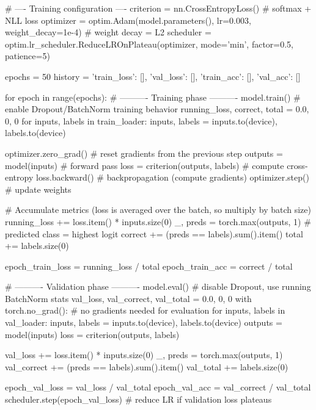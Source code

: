 \begin{codebox}[title={Training configuration}]
# ---- Training configuration ----
criterion = nn.CrossEntropyLoss()                                            # softmax + NLL loss
optimizer = optim.Adam(model.parameters(), lr=0.003, weight_decay=1e-4)      # weight decay = L2
scheduler = optim.lr_scheduler.ReduceLROnPlateau(optimizer, mode='min', factor=0.5, patience=5)

epochs = 50
history = {'train_loss': [], 'val_loss': [], 'train_acc': [], 'val_acc': []}

for epoch in range(epochs):
    # ---------- Training phase ----------
    model.train()                          # enable Dropout/BatchNorm training behavior
    running_loss, correct, total = 0.0, 0, 0
    for inputs, labels in train_loader:
        inputs, labels = inputs.to(device), labels.to(device)

        optimizer.zero_grad()              # reset gradients from the previous step
        outputs = model(inputs)            # forward pass
        loss = criterion(outputs, labels)  # compute cross-entropy
        loss.backward()                    # backpropagation (compute gradients)
        optimizer.step()                   # update weights

        # Accumulate metrics (loss is averaged over the batch, so multiply by batch size)
        running_loss += loss.item() * inputs.size(0)
        _, preds = torch.max(outputs, 1)   # predicted class = highest logit
        correct += (preds == labels).sum().item()
        total += labels.size(0)

    epoch_train_loss = running_loss / total
    epoch_train_acc = correct / total

    # ---------- Validation phase ----------
    model.eval()                           # disable Dropout, use running BatchNorm stats
    val_loss, val_correct, val_total = 0.0, 0, 0
    with torch.no_grad():                  # no gradients needed for evaluation
        for inputs, labels in val_loader:
            inputs, labels = inputs.to(device), labels.to(device)
            outputs = model(inputs)
            loss = criterion(outputs, labels)

            val_loss += loss.item() * inputs.size(0)
            _, preds = torch.max(outputs, 1)
            val_correct += (preds == labels).sum().item()
            val_total += labels.size(0)

    epoch_val_loss = val_loss / val_total
    epoch_val_acc = val_correct / val_total
    scheduler.step(epoch_val_loss)         # reduce LR if validation loss plateaus


\end{codebox}
